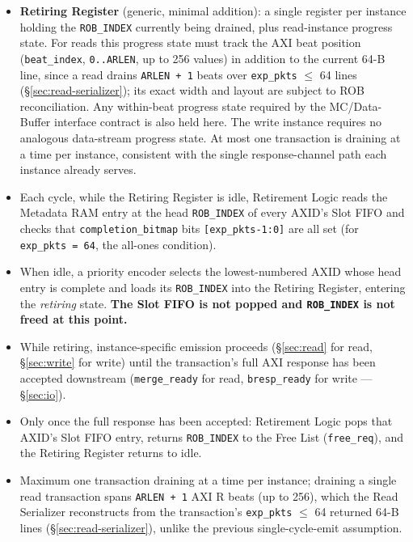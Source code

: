\begin{itemize}[noitemsep]
  \item \textbf{Retiring Register} (generic, minimal addition): a single register per instance holding the \texttt{ROB\_INDEX} currently being drained, plus read-instance progress state.
For reads this progress state must track the AXI beat position
(\texttt{beat\_index}, \texttt{0..ARLEN}, up to 256 values) in addition to
the current 64-B line, since a read drains \texttt{ARLEN + 1} beats over
\texttt{exp\_pkts} $\le$ 64 lines (\S\ref{sec:read-serializer}); its exact
width and layout are subject to ROB reconciliation.  Any within-beat
progress state required by the MC/Data-Buffer interface contract is also
held here.
The write instance requires no analogous data-stream progress state. At most one transaction is draining at a time per instance, consistent with the single response-channel path each instance already serves.
  \item Each cycle, while the Retiring Register is idle, Retirement Logic reads the Metadata RAM entry at the head \texttt{ROB\_INDEX} of every AXID's Slot FIFO and checks that \texttt{completion\_bitmap} bits \texttt{[exp\_pkts-1:0]} are all set (for \texttt{exp\_pkts = 64}, the all-ones condition).
  \item When idle, a priority encoder selects the lowest-numbered AXID whose head entry is complete and loads its \texttt{ROB\_INDEX} into the Retiring Register, entering the \emph{retiring} state. \textbf{The Slot FIFO is not popped and \texttt{ROB\_INDEX} is not freed at this point.}
  \item While retiring, instance-specific emission proceeds (\S\ref{sec:read} for read, \S\ref{sec:write} for write) until the transaction's full AXI response has been accepted downstream (\texttt{merge\_ready} for read, \texttt{bresp\_ready} for write --- \S\ref{sec:io}).
  \item Only once the full response has been accepted: Retirement Logic pops that AXID's Slot FIFO entry, returns \texttt{ROB\_INDEX} to the Free List (\texttt{free\_req}), and the Retiring Register returns to idle.
  \item Maximum one transaction draining at a time per instance; draining a single read transaction spans \texttt{ARLEN + 1} AXI R beats (up to 256), which the Read Serializer reconstructs from the transaction's \texttt{exp\_pkts} $\le$ 64 returned 64-B lines (\S\ref{sec:read-serializer}), unlike the previous single-cycle-emit assumption.
\end{itemize}

